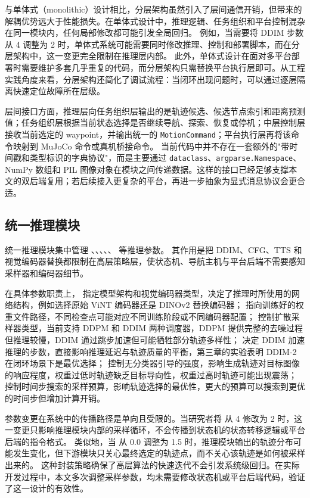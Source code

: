 与单体式（monolithic）设计相比，分层架构虽然引入了层间通信开销，但带来的解耦优势远大于性能损失。在单体式设计中，推理逻辑、任务组织和平台控制混杂在同一模块内，任何局部修改都可能引发全局回归。
例如，当需要将 DDIM 步数从 4 调整为 2 时，单体式系统可能需要同时修改推理、控制和部署脚本，而在分层架构中，这一变更完全限制在推理层内部。
此外，单体式设计在面对多平台部署时需要维护多套几乎重复的代码，而分层架构只需替换平台执行层即可。从工程实践角度来看，分层架构还简化了调试流程：当闭环出现问题时，可以通过逐层隔离快速定位故障所在层级。

层间接口方面，推理层向任务组织层输出的是轨迹候选、候选节点索引和距离预测值；任务组织层根据当前状态选择是否继续导航、探索、恢复或停机；中层控制层接收当前选定的 waypoint，并输出统一的 \texttt{MotionCommand}；平台执行层再将该命令映射到 MuJoCo 命令或真机桥接命令。
当前代码中并不存在一套额外的"带时间戳和类型标识的字典协议"，而是主要通过 \texttt{dataclass}、\texttt{argparse.Namespace}、NumPy 数组和 PIL 图像对象在模块之间传递数据。这样的接口已经足够支撑本文的双后端复用；若后续接入更复杂的平台，再进一步抽象为显式消息协议会更合适。

\subsection{统一推理模块}

统一推理模块集中管理 、、、、、 等推理参数。
其作用是把 DDIM、CFG、TTS 和视觉编码器替换都限制在高层策略层，使状态机、导航主机与平台后端不需要感知采样器和编码器细节。

在具体参数职责上， 指定模型架构和视觉编码器类型，决定了推理时所使用的网络结构，例如选择原始 ViNT 编码器还是 DINOv2 替换编码器； 指向训练好的权重文件路径，不同检查点可能对应不同训练阶段或不同编码器配置； 控制扩散采样器类型，当前支持 DDPM 和 DDIM 两种调度器，DDPM 提供完整的去噪过程但推理较慢，DDIM 通过跳步加速但可能牺牲部分轨迹多样性； 决定 DDIM 加速推理的步数，直接影响推理延迟与轨迹质量的平衡，第三章的实验表明 DDIM-2 在闭环场景下是最优选择； 控制无分类器引导的强度，影响生成轨迹对目标图像的响应程度，权重过低时轨迹缺乏目标导向性，权重过高时轨迹可能出现震荡； 控制时间步搜索的采样预算，影响轨迹选择的最优性，更大的预算可以搜索到更优的时间步但增加计算开销。

参数变更在系统中的传播路径是单向且受限的。当研究者将  从 4 修改为 2 时，这一变更只影响推理模块内部的采样循环，不会传播到状态机的状态转移逻辑或平台后端的指令格式。
类似地，当  从 0.0 调整为 1.5 时，推理模块输出的轨迹分布可能发生变化，但下游模块只关心最终选定的轨迹点，而不关心该轨迹是如何被采样出来的。
这种封装策略确保了高层算法的快速迭代不会引发系统级回归。在实际开发过程中，本文多次调整采样参数，均未需要修改状态机或平台后端代码，验证了这一设计的有效性。

